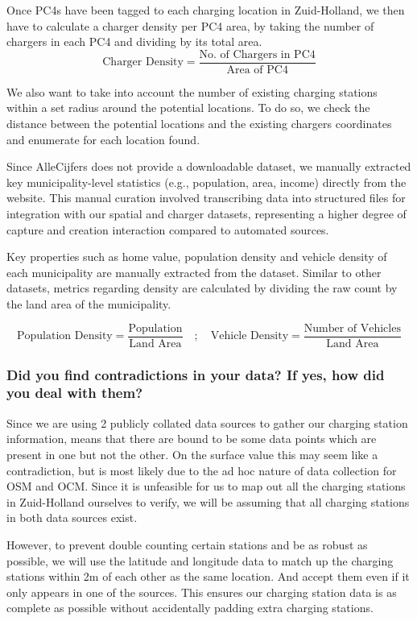 \documentclass{article}
\newcommand{\question}[1]{#1}
\begin{document}
Once PC4s have been tagged to each charging location in Zuid-Holland, we then have to calculate a charger density per PC4 area, by taking the number of chargers in each PC4 and dividing by its total area.
$$
	\text{Charger Density} = \frac{\text{No. of Chargers in PC4}}{\text{Area of PC4}}
$$

We also want to take into account the number of existing charging stations within a set radius around the potential locations. To do so, we check the distance between the potential locations and the existing chargers coordinates and enumerate for each location found.

Since AlleCijfers does not provide a downloadable dataset, we manually extracted key municipality-level statistics (e.g., population, area, income) directly from the website. This manual curation involved transcribing data into structured files for integration with our spatial and charger datasets, representing a higher degree of capture and creation interaction compared to automated sources.

Key properties such as home value, population density and vehicle density of each municipality are manually extracted from the dataset. Similar to other datasets, metrics regarding density are calculated by dividing the raw count by the land area of the municipality.

\[
	\text{Population Density} = \frac{\text{Population}}{\text{Land Area}} \quad ; \quad
	\text{Vehicle Density} = \frac{\text{Number of Vehicles}}{\text{Land Area}}
\]

\question{\subsubsection*{Did you find contradictions in your data? If yes, how did you deal with them?}}
\label{subsubsection:contradictions}
Since we are using 2 publicly collated data sources to gather our charging station information, means that there are bound to be some data points which are present in one but not the other. On the surface value this may seem like a contradiction, but is most likely due to the ad hoc nature of data collection for OSM and OCM. Since it is unfeasible for us to map out all the charging stations in Zuid-Holland ourselves to verify, we will be assuming that all charging stations in both data sources exist.

However, to prevent double counting certain stations and be as robust as possible, we will use the latitude and longitude data to match up the charging stations within 2m of each other as the same location. And accept them even if it only appears in one of the sources. This ensures our charging station data is as complete as possible without accidentally padding extra charging stations.
\end{document}
